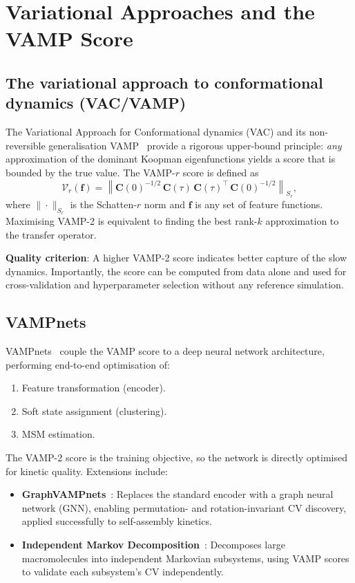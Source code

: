 \documentclass[12pt, a4paper]{article}
\begin{document}
\section{Variational Approaches and the VAMP Score}
\label{sec:vamp}

\subsection{The variational approach to conformational dynamics (VAC/VAMP)}

The Variational Approach for Conformational dynamics (VAC) and its 
non-reversible generalisation VAMP~\citep{Wu2020VAMP} provide a 
rigorous upper-bound principle: \emph{any} approximation of the 
dominant Koopman eigenfunctions yields a score that is bounded by the 
true value.  The VAMP-$r$ score is defined as
\begin{equation}
  \mathcal{V}_r(\mathbf{f}) = 
  \left\|\mathbf{C}(0)^{-1/2}\,\mathbf{C}(\tau)\,\mathbf{C}(\tau)^\top
         \,\mathbf{C}(0)^{-1/2}\right\|_{S_r},
\end{equation}
where $\|\cdot\|_{S_r}$ is the Schatten-$r$ norm and $\mathbf{f}$ is 
any set of feature functions.  Maximising VAMP-2 is equivalent to 
finding the best rank-$k$ approximation to the transfer operator.

\textbf{Quality criterion}: A higher VAMP-2 score indicates better 
capture of the slow dynamics.  Importantly, the score can be computed 
from data alone and used for cross-validation and hyperparameter 
selection without any reference simulation.

\subsection{VAMPnets}

VAMPnets~\citep{Mardt2018VAMPnets} couple the VAMP score to a deep 
neural network architecture, performing end-to-end optimisation of:
\begin{enumerate}[noitemsep]
  \item Feature transformation (encoder).
  \item Soft state assignment (clustering).
  \item MSM estimation.
\end{enumerate}
The VAMP-2 score is the training objective, so the network is directly 
optimised for kinetic quality.  Extensions include:
\begin{itemize}[noitemsep]
  \item \textbf{GraphVAMPnets}~\citep{GraphVAMPnets2023}: Replaces the 
        standard encoder with a graph neural network (GNN), enabling 
        permutation- and rotation-invariant CV discovery, applied 
        successfully to self-assembly kinetics.
  \item \textbf{Independent Markov Decomposition}~\citep{Hempel2022IMD}: 
        Decomposes large macromolecules into independent Markovian 
        subsystems, using VAMP scores to validate each subsystem's CV 
        independently.
\end{itemize}
\end{document}
